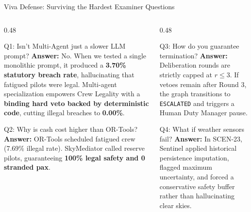 \documentclass[aspectratio=169,10pt]{beamer}
\begin{document}
\begin{frame}{Viva Defense: Surviving the Hardest Examiner Questions}
  \begin{columns}[t]
    \begin{column}{0.48\textwidth}
      \begin{block}{Q1: Isn't Multi-Agent just a slower LLM prompt?}
        \scriptsize\textbf{Answer:} No. When we tested a single monolithic prompt, it produced a \textbf{3.70\% statutory breach rate}, hallucinating that fatigued pilots were legal. Multi-agent specialization empowers Crew Legality with a \textbf{binding hard veto backed by deterministic code}, cutting illegal breaches to \textbf{0.00\%}.
      \end{block}
      \begin{block}{Q2: Why is cash cost higher than OR-Tools?}
        \scriptsize\textbf{Answer:} OR-Tools scheduled fatigued crew (7.69\% illegal rate). SkyMediator called reserve pilots, guaranteeing \textbf{100\% legal safety and 0 stranded pax}.
      \end{block}
    \end{column}
    \begin{column}{0.48\textwidth}
      \begin{block}{Q3: How do you guarantee termination?}
        \scriptsize\textbf{Answer:} Deliberation rounds are strictly capped at $r \le 3$. If vetoes remain after Round 3, the graph transitions to \texttt{ESCALATED} and triggers a Human Duty Manager pause.
      \end{block}
      \begin{block}{Q4: What if weather sensors fail?}
        \scriptsize\textbf{Answer:} In SCEN-23, Sentinel applied historical persistence imputation, flagged maximum uncertainty, and forced a conservative safety buffer rather than hallucinating clear skies.
      \end{block}
    \end{column}
  \end{columns}
\end{frame}
\end{document}
